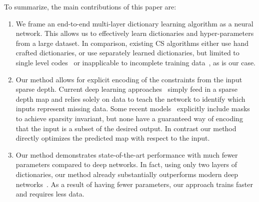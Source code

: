 
To summarize, the main contributions of this paper are:
\begin{enumerate}
\item We frame an end-to-end multi-layer dictionary learning algorithm as a neural network. This allows us to effectively learn dictionaries and hyper-parameters from a large dataset. In comparison, existing CS algorithms either use hand crafted dictionaries, or use separately learned dictionaries, but limited to single level codes~\cite{} or inapplicable to incomplete training data~\cite{}, as is our case.

  
\item Our method allows for explicit encoding of the constraints from the input sparse depth. Current deep learning approaches~\cite{} simply feed in a sparse depth map and relies solely on data to teach the network to identify which inputs represent missing data. Some recent models~\cite{} explicitly include masks to achieve sparsity invariant, but none have a guaranteed way of encoding that the input is a subset of the desired output. In contrast our method directly optimizes the predicted map with respect to the input.
  
  
\item Our method demonstrates state-of-the-art performance with much fewer parameters compared to deep networks. In fact,  using only two layers of dictionaries, our method already substantially outperforms modern deep networks~\cite{}. As a result of having fewer parameters, our approach trains faster and requires less data.
  
\end{enumerate}
  